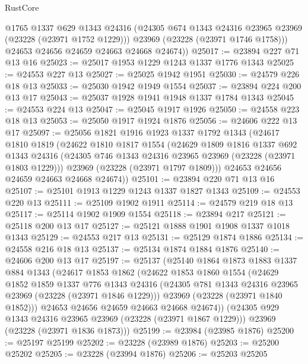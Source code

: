 \begin{lexlean}{RustCore}
\begin{coremodule}
          @1765
          @1337
          @629
          @1343
          @24316
          (@24305 @674 @1343 @24316 @23965 @23969 (@23228 (@23971 @1752 @1229)))
          @23969
          (@23228 (@23971 @1746 @1758)))
        @24653
        @24656
        @24659
        @24663
        @24668
        @24674))
@25017 := @23894 @227 @71 @13 @16
@25023 := @25017 @1953 @1229 @1243 @1337 @1776 @1343
@25025 := @24553 @227 @13
@25027 := @25025 @1942 @1951
@25030 := @24579 @226 @18 @13
@25033 := @25030 @1942 @1949 @1554
@25037 := @23894 @224 @200 @13 @17
@25043 := @25037 @1928 @1941 @1948 @1337 @1784 @1343
@25045 := @24553 @224 @13
@25047 := @25045 @1917 @1926
@25050 := @24558 @223 @18 @13
@25053 := @25050 @1917 @1924 @1876
@25056 := @24606 @222 @13 @17
@25097 := @25056
    @1821
    @1916
    @1923
    @1337
    @1792
    @1343
    (@24617
      @1810
      @1819
      (@24622
        @1810
        @1817
        @1554
        (@24629
          @1809
          @1816
          @1337
          @692
          @1343
          @24316
          (@24305 @746 @1343 @24316 @23965 @23969 (@23228 (@23971 @1803 @1229)))
          @23969
          (@23228 (@23971 @1797 @1809)))
        @24653
        @24656
        @24659
        @24663
        @24668
        @24674))
@25101 := @23894 @220 @71 @13 @16
@25107 := @25101 @1913 @1229 @1243 @1337 @1827 @1343
@25109 := @24553 @220 @13
@25111 := @25109 @1902 @1911
@25114 := @24579 @219 @18 @13
@25117 := @25114 @1902 @1909 @1554
@25118 := @23894 @217
@25121 := @25118 @200 @13 @17
@25127 := @25121 @1888 @1901 @1908 @1337 @1018 @1343
@25129 := @24553 @217 @13
@25131 := @25129 @1874 @1886
@25134 := @24558 @216 @18 @13
@25137 := @25134 @1874 @1884 @1876
@25140 := @24606 @200 @13 @17
@25197 := @25137
    (@25140
      @1864
      @1873
      @1883
      @1337
      @884
      @1343
      (@24617
        @1853
        @1862
        (@24622
          @1853
          @1860
          @1554
          (@24629
            @1852
            @1859
            @1337
            @776
            @1343
            @24316
            (@24305 @781 @1343 @24316 @23965 @23969 (@23228 (@23971 @1846 @1229)))
            @23969
            (@23228 (@23971 @1840 @1852)))
          @24653
          @24656
          @24659
          @24663
          @24668
          @24674))
      (@24305 @929 @1343 @24316 @23965 @23969 (@23228 (@23971 @1867 @1229)))
      @23969
      (@23228 (@23971 @1836 @1873)))
@25199 := @23984 (@23985 @1876)
@25200 := @25197 @25199
@25202 := @23228 (@23989 @1876)
@25203 := @25200 @25202
@25205 := @23228 (@23994 @1876)
@25206 := @25203 @25205

\end{coremodule}
\end{lexlean}
